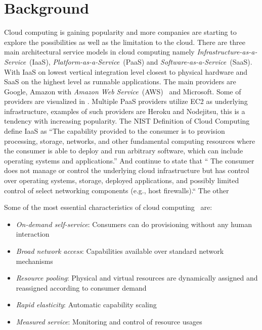 \chapter{Background}




Cloud computing is gaining popularity and more companies are starting 
to explore the possibilities as well as the limitation to the cloud.
There are three main architectural service models in cloud computing\cite{introduction:wozniak10}
namely \emph{Infrastructure-as-a-Service}~(IaaS), \emph{Platform-as-a-Service}~(PaaS)
and \emph{Software-as-a-Service}~(SaaS).
With IaaS on lowest vertical integration level closest to physical hardware and SaaS on the highest
level as runnable applications.
The main providers are Google, Amazon with \emph{Amazon Web Service}~(AWS)~\cite{aws} and Microsoft.
Some of providers are visualized in .
Multiple PaaS providers utilize EC2 as underlying infrastructure, examples of such
providers are Heroku and Nodejitsu, this is a tendency with increasing popularity.
The NIST Definition of Cloud Computing~\cite{nist:mell11} define IaaS as
``The capability provided to the consumer is to provision 
processing, storage, networks, and other fundamental computing resources where the 
consumer is able to deploy and run arbitrary software, which can include operating 
systems and applications.'' 
And continue to state that `` The consumer does not manage or control the underlying cloud 
infrastructure but has control over operating systems, storage, deployed applications, and 
possibly limited control of select networking components (e.g., host firewalls).``
The other 


Some of the most essential characteristics of cloud computing~\cite{nist:mell11} are:
\begin{itemize}
  \item \emph{On-demand self-service}: Consumers can do provisioning without any human interaction
  \item \emph{Broad network access}: Capabilities available over standard network mechanisms
  \item \emph{Resource pooling}: Physical and virtual resources are dynamically assigned
    and reassigned according to consumer demand
  \item \emph{Rapid elasticity}: Automatic capability scaling
  \item \emph{Measured service}: Monitoring and control of resource usages
\end{itemize}

